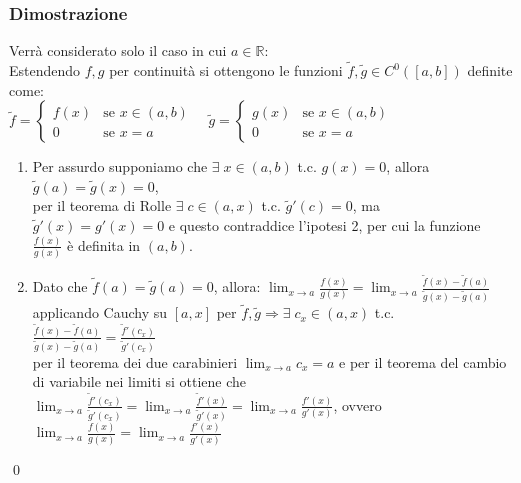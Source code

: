 \documentclass[a4paper]{article}
\newcommand\cont[2]{C^{#1} \left({#2}\right)}
\begin{document}
\subsubsection*{Dimostrazione}
Verrà considerato solo il caso in cui \(a \in \mathbb{R}\): \\
Estendendo \(f, g\) per continuità si ottengono le funzioni \(\widetilde{f}, \widetilde{g} \in \cont{0}{\left[a, b\right]}\) definite come: \\
\(\displaystyle \widetilde{f} = \begin{cases}
	f(x) &\text{se } x \in \left(a, b\right) \\
	0 &\text{se } x = a
\end{cases}
\quad \widetilde{g} = \begin{cases}
	g(x) &\text{se } x \in \left(a, b\right) \\
	0 &\text{se } x = a
\end{cases}\)
\begin{enumerate}
	\item Per assurdo supponiamo che \(\exists \; x \in \left(a, b\right)\) t.c. \(g(x) = 0\), allora \(\widetilde{g}(a) = \widetilde{g}(x) = 0\), \\
	per il teorema di Rolle \(\exists \; c \in \left(a, x\right)\) t.c. \(\widetilde{g}'(c) = 0\), ma \(\widetilde{g}'(x) = g'(x) = 0\)
	e questo contraddice l'ipotesi 2, per cui la funzione \(\displaystyle \frac{f(x)}{g(x)}\) è definita in \(\left(a, b\right)\).
	\item Dato che \(\widetilde{f}(a) = \widetilde{g}(a) = 0\), allora: 
	\(\displaystyle \lim_{x \to a} \frac{f(x)}{g(x)} = \lim_{x \to a} \frac{\widetilde{f}(x)-\widetilde{f}(a)}{\widetilde{g}(x)-\widetilde{g}(a)}\) \\
	applicando Cauchy su \(\left[a, x\right]\) per \(\widetilde{f}, \widetilde{g} \Rightarrow \exists \; c_x \in \left(a, x\right)\) t.c.
	\(\displaystyle \frac{\widetilde{f}(x)-\widetilde{f}(a)}{\widetilde{g}(x)-\widetilde{g}(a)} = \frac{\widetilde{f}'(c_x)}{\widetilde{g}'(c_x)}\) \\
	per il teorema dei due carabinieri \(\lim_{x \to a} c_x = a\) e per il teorema del cambio di variabile nei limiti si ottiene che 
	\(\displaystyle \lim_{x \to a} \frac{\widetilde{f}'(c_x)}{\widetilde{g}'(c_x)} = \lim_{x \to a} \frac{\widetilde{f}'(x)}{\widetilde{g}'(x)} = \lim_{x \to a} \frac{f'(x)}{g'(x)}\),
	ovvero \(\displaystyle \lim_{x \to a} \frac{f(x)}{g(x)} = \lim_{x \to a} \frac{f'(x)}{g'(x)}\) 
\end{enumerate}
\qed
\end{document}
